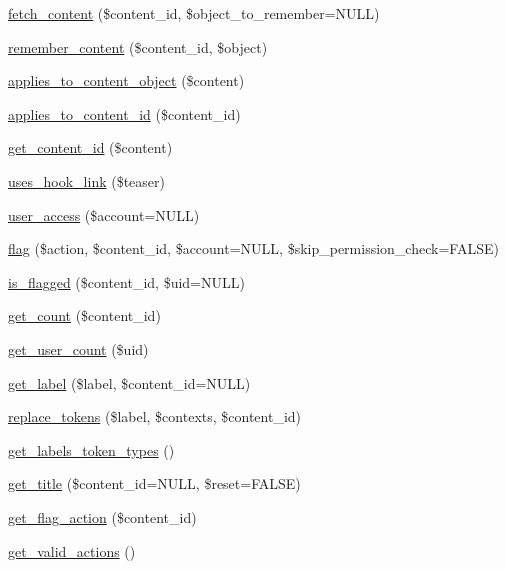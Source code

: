\begin{CompactItemize}
\item 
\hyperlink{classflag__flag_c3ce89d9e532fb31b9552ff37b7f0f08}{fetch\_\-content} (\$content\_\-id, \$object\_\-to\_\-remember=NULL)
\item 
\hyperlink{classflag__flag_f42191a47f6338e9176aa328bec5d56f}{remember\_\-content} (\$content\_\-id, \$object)
\item 
\hyperlink{classflag__flag_55c4da8291aed979309f25ce09953092}{applies\_\-to\_\-content\_\-object} (\$content)
\item 
\hyperlink{classflag__flag_a38afcc59d7d1ef028215521c6fcdc22}{applies\_\-to\_\-content\_\-id} (\$content\_\-id)
\item 
\hyperlink{classflag__flag_4da5889b258c2bc28b248678573b881a}{get\_\-content\_\-id} (\$content)
\item 
\hyperlink{classflag__flag_10e87c5a12cc7b857d388985295bc8ab}{uses\_\-hook\_\-link} (\$teaser)
\item 
\hyperlink{classflag__flag_4ea0b1daeca6c2ef4a900a8a13785b6c}{user\_\-access} (\$account=NULL)
\item 
\hyperlink{classflag__flag_ed72cdfae0ffef546c45cfa0f616283a}{flag} (\$action, \$content\_\-id, \$account=NULL, \$skip\_\-permission\_\-check=FALSE)
\item 
\hyperlink{classflag__flag_82aa6ee546607848f4df8688bfaf93bc}{is\_\-flagged} (\$content\_\-id, \$uid=NULL)
\item 
\hyperlink{classflag__flag_0c554010b3ba4b116a2ace87d5703276}{get\_\-count} (\$content\_\-id)
\item 
\hyperlink{classflag__flag_868c7b3d72878b7c15ad7b007c9c7429}{get\_\-user\_\-count} (\$uid)
\item 
\hyperlink{classflag__flag_a1c3caa4b642328ce9ff999ab0cf128b}{get\_\-label} (\$label, \$content\_\-id=NULL)
\item 
\hyperlink{classflag__flag_6fa61cada1cb5f94c64b3037fdd28da1}{replace\_\-tokens} (\$label, \$contexts, \$content\_\-id)
\item 
\hyperlink{classflag__flag_bc21f4a879072d1a9d36b352e9ac6be0}{get\_\-labels\_\-token\_\-types} ()
\item 
\hyperlink{classflag__flag_826bf98cd0e5d8ae413d8d60e5b5a0d9}{get\_\-title} (\$content\_\-id=NULL, \$reset=FALSE)
\item 
\hyperlink{classflag__flag_532e58b6e71a0ef8f6bcb55607cbca8e}{get\_\-flag\_\-action} (\$content\_\-id)
\item 
\hyperlink{group__actions_gbe1aa2bfc551fab8660cc3bacfc9d509}{get\_\-valid\_\-actions} ()

\end{CompactItemize}
